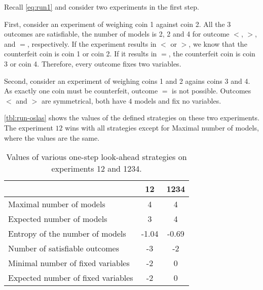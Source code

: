 \begin{example}
Recall \autoref{eq:run1} and consider two experiments in the first step.

First, consider an experiment of weighing coin 1 against coin 2.
All the 3 outcomes are satisfiable, the number of models is
  2, 2 and 4 for outcome $<$, $>$, and $=$, respectively.
If the experiment results in $<$ or $>$, we know that the counterfeit coin
is coin 1 or coin 2. If it results in $=$, the counterfeit coin is coin 3 or coin 4.
Therefore, every outcome fixes two variables.

Second, consider an experiment of weighing coins 1 and 2 agains coins 3 and 4.
As exactly one coin must be counterfeit, outcome $=$ is not possible.
Outcomes $<$ and $>$ are symmetrical, both have $4$ models and fix no variables.

\autoref{tbl:run-oslas} shows the values of the defined
  strategies on these two experiments.
The experiment $12$ wins with all strategies except for Maximal number of models,
  where the values are the same.
\begin{table}[h]
\begin{center}
\begin{tabular}{l|cc}
& 12 & 1234 \\\hline
Maximal number of models & 4 & 4 \\
Expected number of models & 3 & 4 \\
Entropy of the number of models & -1.04 & -0.69 \\
Number of satisfiable outcomes & -3 & -2 \\
Minimal number of fixed variables & -2 & 0 \\
Expected number of fixed variables & -2 & 0 \\
\end{tabular}
\caption{Values of various one-step look-ahead strategies on experiments 12 and 1234.}
\label{tbl:run-oslas}
\end{center}
\end{table}

\end{example}




